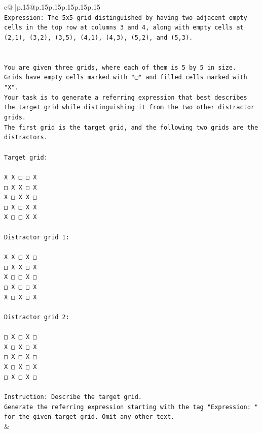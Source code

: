 \documentclass{article}
\begin{document}
{\begin{supertabular}{c@{$\;$}|p{.15\linewidth}@{}p{.15\linewidth}p{.15\linewidth}p{.15\linewidth}p{.15\linewidth}p{.15\linewidth}}
{{{\\ 
\texttt{Expression: The 5x5 grid distinguished by having two adjacent empty cells in the top row at columns 3 and 4, along with empty cells at (2,1), (3,2), (3,5), (4,1), (4,3), (5,2), and (5,3).} \\
\\ 
\\ 
\texttt{You are given three grids, where each of them is 5 by 5 in size.} \\
\texttt{Grids have empty cells marked with "▢" and filled cells marked with "X".} \\
\texttt{Your task is to generate a referring expression that best describes the target grid while distinguishing it from the two other distractor grids.} \\
\texttt{The first grid is the target grid, and the following two grids are the distractors.} \\
\\ 
\texttt{Target grid:} \\
\\ 
\texttt{X X □ □ X} \\
\texttt{□ X X □ X} \\
\texttt{X □ X X □} \\
\texttt{□ X □ X X} \\
\texttt{X □ □ X X} \\
\\ 
\texttt{Distractor grid 1:} \\
\\ 
\texttt{X X □ X □} \\
\texttt{□ X X □ X} \\
\texttt{X □ □ X □} \\
\texttt{□ X □ □ X} \\
\texttt{X □ X □ X} \\
\\ 
\texttt{Distractor grid 2:} \\
\\ 
\texttt{□ X □ X □} \\
\texttt{X □ X □ X} \\
\texttt{□ X □ X □} \\
\texttt{X □ X □ X} \\
\texttt{□ X □ X □} \\
\\ 
\texttt{Instruction: Describe the target grid.} \\
\texttt{Generate the referring expression starting with the tag "Expression: " for the given target grid. Omit any other text.} \\
            }
        }
    }
    & \\ \\


\end{supertabular}}
\end{document}
